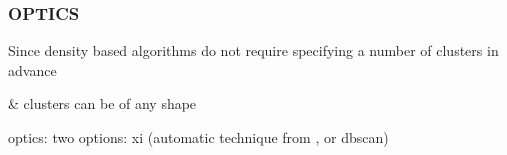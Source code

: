 



  


\subsubsection{OPTICS}









Since density based algorithms do not require specifying a number of clusters in advance

\& clusters can be of any shape

optics: two options: xi (automatic technique from \textcite{OPTICS}, or dbscan)


